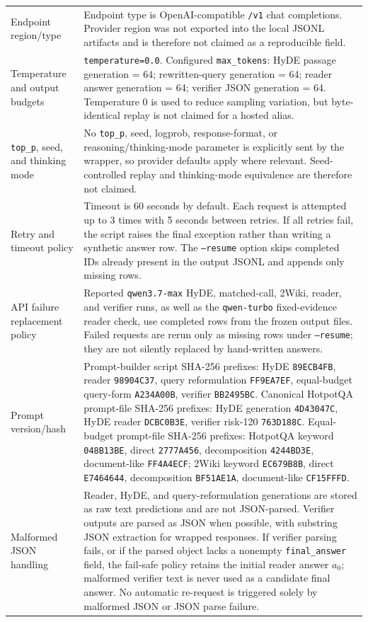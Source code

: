 \begin{table}[t]
\begin{threeparttable}
\begin{tabularx}{\textwidth}{>{\raggedright\arraybackslash}p{}
                            >{\raggedright\arraybackslash}X}
Endpoint region/type & Endpoint type is OpenAI-compatible \texttt{/v1} chat completions. Provider region was not exported into the local JSONL artifacts and is therefore not claimed as a reproducible field. \\
Temperature and output budgets & \texttt{temperature=0.0}. Configured \texttt{max\_tokens}: HyDE passage generation = 64; rewritten-query generation = 64; reader answer generation = 64; verifier JSON generation = 64. Temperature 0 is used to reduce sampling variation, but byte-identical replay is not claimed for a hosted alias. \\
\texttt{top\_p}, seed, and thinking mode & No \texttt{top\_p}, seed, logprob, response-format, or reasoning/thinking-mode parameter is explicitly sent by the wrapper, so provider defaults apply where relevant. Seed-controlled replay and thinking-mode equivalence are therefore not claimed. \\
Retry and timeout policy & Timeout is 60 seconds by default. Each request is attempted up to 3 times with 5 seconds between retries. If all retries fail, the script raises the final exception rather than writing a synthetic answer row. The \texttt{--resume} option skips completed IDs already present in the output JSONL and appends only missing rows. \\
API failure replacement policy & Reported \texttt{qwen3.7-max} HyDE, matched-call, 2Wiki, reader, and verifier runs, as well as the \texttt{qwen-turbo} fixed-evidence reader check, use completed rows from the frozen output files. Failed requests are rerun only as missing rows under \texttt{--resume}; they are not silently replaced by hand-written answers. \\
Prompt version/hash & Prompt-builder script SHA-256 prefixes: HyDE \texttt{89ECB4FB}, reader \texttt{98904C37}, query reformulation \texttt{FF9EA7EF}, equal-budget query-form \texttt{A234A00B}, verifier \texttt{BB2495BC}. Canonical HotpotQA prompt-file SHA-256 prefixes: HyDE generation \texttt{4D43047C}, HyDE reader \texttt{DCBC0B3E}, verifier risk-120 \texttt{763D188C}. Equal-budget prompt-file SHA-256 prefixes: HotpotQA keyword \texttt{048B13BE}, direct \texttt{2777A456}, decomposition \texttt{4244BD3E}, document-like \texttt{FF4A4ECF}; 2Wiki keyword \texttt{EC679B8B}, direct \texttt{E7464644}, decomposition \texttt{BF51AE1A}, document-like \texttt{CF15FFFD}. \\
Malformed JSON handling & Reader, HyDE, and query-reformulation generations are stored as raw text predictions and are not JSON-parsed. Verifier outputs are parsed as JSON when possible, with substring JSON extraction for wrapped responses. If verifier parsing fails, or if the parsed object lacks a nonempty \texttt{final\_answer} field, the fail-safe policy retains the initial reader answer $a_0$; malformed verifier text is never used as a candidate final answer. No automatic re-request is triggered solely by malformed JSON or JSON parse failure. \\

\end{tabularx}
\end{threeparttable}
\end{table}
